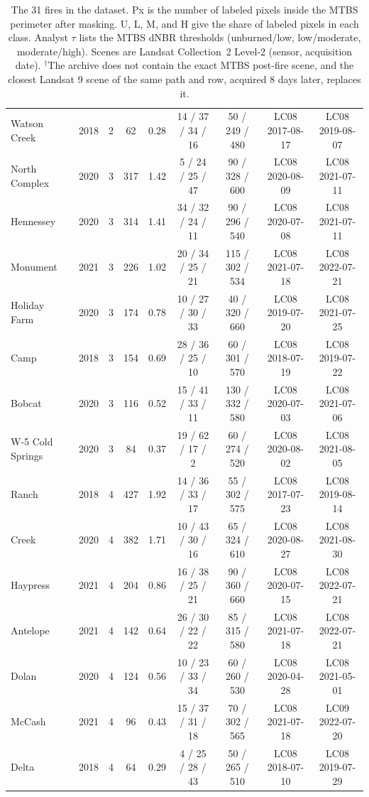 \begin{table}[H]
\begin{tabular}{lcccccccc}
Watson Creek & 2018 & 2 & 62 & 0.28 & 14 / 37 / 34 / 16 & 50 / 249 / 480 & LC08 2017-08-17 & LC08 2019-08-07 \\
North Complex & 2020 & 3 & 317 & 1.42 & 5 / 24 / 25 / 47 & 90 / 328 / 600 & LC08 2020-08-09 & LC08 2021-07-11 \\
Hennessey & 2020 & 3 & 314 & 1.41 & 34 / 32 / 24 / 11 & 90 / 296 / 540 & LC08 2020-07-08 & LC08 2021-07-11 \\
Monument & 2021 & 3 & 226 & 1.02 & 20 / 34 / 25 / 21 & 115 / 302 / 534 & LC08 2021-07-18 & LC08 2022-07-21 \\
Holiday Farm & 2020 & 3 & 174 & 0.78 & 10 / 27 / 30 / 33 & 40 / 320 / 660 & LC08 2019-07-20 & LC08 2021-07-25 \\
Camp & 2018 & 3 & 154 & 0.69 & 28 / 36 / 25 / 10 & 60 / 301 / 570 & LC08 2018-07-19 & LC08 2019-07-22 \\
Bobcat & 2020 & 3 & 116 & 0.52 & 15 / 41 / 33 / 11 & 130 / 332 / 580 & LC08 2020-07-03 & LC08 2021-07-06 \\
W-5 Cold Springs & 2020 & 3 & 84 & 0.37 & 19 / 62 / 17 / 2 & 60 / 274 / 520 & LC08 2020-08-02 & LC08 2021-08-05 \\
Ranch & 2018 & 4 & 427 & 1.92 & 14 / 36 / 33 / 17 & 55 / 302 / 575 & LC08 2017-07-23 & LC08 2019-08-14 \\
Creek & 2020 & 4 & 382 & 1.71 & 10 / 43 / 30 / 16 & 65 / 324 / 610 & LC08 2020-08-27 & LC08 2021-08-30 \\
Haypress & 2021 & 4 & 204 & 0.86 & 16 / 38 / 25 / 21 & 90 / 360 / 660 & LC08 2020-07-15 & LC08 2022-07-21 \\
Antelope & 2021 & 4 & 142 & 0.64 & 26 / 30 / 22 / 22 & 85 / 315 / 580 & LC08 2021-07-18 & LC08 2022-07-21 \\
Dolan & 2020 & 4 & 124 & 0.56 & 10 / 23 / 33 / 34 & 60 / 260 / 530 & LC08 2020-04-28 & LC08 2021-05-01 \\
McCash & 2021 & 4 & 96 & 0.43 & 15 / 37 / 31 / 18 & 70 / 302 / 565 & LC08 2021-07-18 & LC09 2022-07-20 \\
Delta & 2018 & 4 & 64 & 0.29 & 4 / 25 / 28 / 43 & 50 / 265 / 510 & LC08 2018-07-10 & LC08 2019-07-29 \\
\bottomrule
\end{tabular}
\caption{The 31 fires in the dataset. Px is the number of labeled pixels inside the MTBS perimeter after masking. U, L, M, and H give the share of labeled pixels in each class. Analyst $\tau$ lists the MTBS dNBR thresholds (unburned/low, low/moderate, moderate/high). Scenes are Landsat Collection~2 Level-2 (sensor, acquisition date). $^\dagger$The archive does not contain the exact MTBS post-fire scene, and the closest Landsat 9 scene of the same path and row, acquired 8 days later, replaces it.}
\label{tab:fires}
\end{table}
